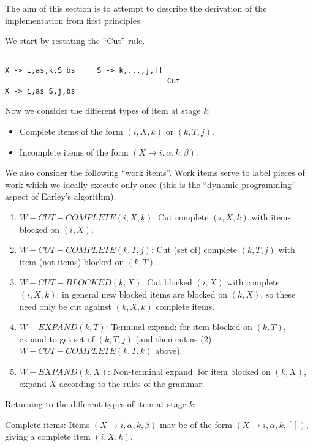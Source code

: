\documentclass[]{article}
\begin{document}
\begin{multicols}{2}
The aim of this section is to attempt to describe the derivation of the
implementation from first principles.

We start by restating the ``Cut'' rule.

\begin{verbatim}

X -> i,as,k,S bs     S -> k,...,j,[]
------------------------------------ Cut
X -> i,as S,j,bs

\end{verbatim}

Now we consider the different types of item at stage \(k\):

\begin{itemize}
\itemsep1pt\parskip0pt
\item
  Complete items of the form \((i,X,k)\) or \((k,T,j)\).
\item
  Incomplete items of the form \((X \rightarrow{} i,\alpha,k,\beta)\).
\end{itemize}

We also consider the following ``work items''. Work items serve to label
pieces of work which we ideally execute only once (this is the ``dynamic
programming'' aspect of Earley's algorithm).

\begin{enumerate}
\def\labelenumi{(\arabic{enumi})}
\item
  \(W-CUT-COMPLETE(i,X,k)\): Cut complete \((i,X,k)\) with items blocked
  on \((i,X)\).
\item
  \(W-CUT-COMPLETE(k,T,j)\): Cut (set of) complete \((k,T,j)\) with item
  (not items) blocked on \((k,T)\).
\item
  \(W-CUT-BLOCKED(k,X)\): Cut blocked \((i,X)\) with complete
  \((i,X,k)\); in general new blocked items are blocked on \((k,X)\), so
  these need only be cut against \((k,X,k)\) complete items.
\item
  \(W-EXPAND(k,T)\): Terminal expand: for item blocked on \((k,T)\),
  expand to get set of \((k,T,j)\) (and then cut as (2)
  \(W-CUT-COMPLETE(k,T,k)\) above).
\item
  \(W-EXPAND(k,X)\): Non-terminal expand: for item blocked on \((k,X)\),
  expand \(X\) according to the rules of the grammar.
\end{enumerate}

Returning to the different types of item at stage \(k\):

Complete items: Items \((X \rightarrow{} i,\alpha,k,\beta)\) may be of
the form \((X \rightarrow{} i,\alpha,k,[])\), giving a complete item
\((i,X,k)\).


\end{multicols}
\end{document}

